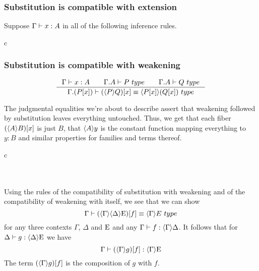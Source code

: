 \subsubsection{Substitution is compatible with extension}
Suppose $\jterm{\Gamma}{A}{x}$ in all of the following inference rules.
\begin{infarray}{c}
\end{infarray}

\subsubsection{Substitution is compatible with weakening}
\begin{equation*}
\inference{\jterm{\Gamma}{A}{x}\qquad\jtype{\ctxext{\Gamma}{A}}{P}\qquad\jtype{\ctxext{\Gamma}{A}}{Q}}
          {\jtypeeq{\ctxext{\Gamma}{\subst{x}{P}}}{\subst{x}{\ctxwk{P}{Q}}}{\ctxwk{\subst{x}{P}}{\subst{x}{Q}}}}
\end{equation*}

The judgmental equalities we're about to describe assert that weakening followed
by substitution leaves everything untouched. Thus, we get that each fiber
$\subst{x}{\ctxwk{A}{B}}$ is just $B$, that $\ctxwk{A}{y}$ is the constant function
mapping everything to $y:B$ and similar properties for families and terms thereof.

\begin{infarray}{c}
\\
\\
\\
\end{infarray}

Using the rules of the compatibility of substitution with weakening and of the
compatibility of weakening with itself, we see that we can show
\begin{equation*}
\jtypeeq{\Gamma}{\subst{f}{\ctxwk{\Gamma}{{\Delta}{\greek{E}}}}}{\ctxwk{\Gamma}{E}}
\end{equation*}
for any three contexts $\Gamma$, $\Delta$ and $\mathrm{E}$ and any $\jhom{\Gamma}{\Delta}{f}$.
It follows that for $\jhom{\Delta}{\greek{E}}{g}$ we have
\begin{equation*}
\jhom{\Gamma}{\greek{E}}{\subst{f}{\ctxwk{\Gamma}{g}}}
\end{equation*}
The term $\jcomp{\Gamma}{f}{g}$ is the composition of $g$ with $f$.

